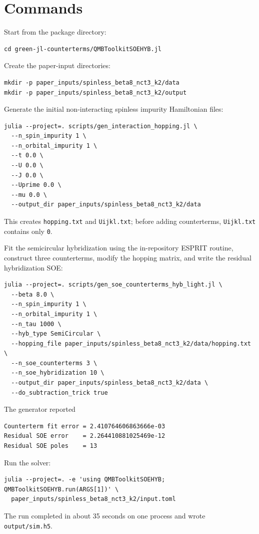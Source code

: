 \documentclass[11pt,a4paper]{article}
\theoremstyle{definition}
\theoremstyle{plain}
\begin{document}
\section{Commands}

Start from the package directory:
\begin{verbatim}
cd green-jl-counterterms/QMBToolkitSOEHYB.jl
\end{verbatim}

Create the paper-input directories:
\begin{verbatim}
mkdir -p paper_inputs/spinless_beta8_nct3_k2/data
mkdir -p paper_inputs/spinless_beta8_nct3_k2/output
\end{verbatim}

Generate the initial non-interacting spinless impurity Hamiltonian files:
\begin{verbatim}
julia --project=. scripts/gen_interaction_hopping.jl \
  --n_spin_impurity 1 \
  --n_orbital_impurity 1 \
  --t 0.0 \
  --U 0.0 \
  --J 0.0 \
  --Uprime 0.0 \
  --mu 0.0 \
  --output_dir paper_inputs/spinless_beta8_nct3_k2/data
\end{verbatim}
This creates \texttt{hopping.txt} and \texttt{Uijkl.txt}; before adding
counterterms, \texttt{Uijkl.txt} contains only \texttt{0}.

Fit the semicircular hybridization using the in-repository ESPRIT routine,
construct three counterterms, modify the hopping matrix, and write the residual
hybridization SOE:
\begin{verbatim}
julia --project=. scripts/gen_soe_counterterms_hyb_light.jl \
  --beta 8.0 \
  --n_spin_impurity 1 \
  --n_orbital_impurity 1 \
  --n_tau 1000 \
  --hyb_type SemiCircular \
  --hopping_file paper_inputs/spinless_beta8_nct3_k2/data/hopping.txt \
  --n_soe_counterterms 3 \
  --n_soe_hybridization 10 \
  --output_dir paper_inputs/spinless_beta8_nct3_k2/data \
  --do_subtraction_trick true
\end{verbatim}
The generator reported
\begin{verbatim}
Counterterm fit error = 2.410764606863666e-03
Residual SOE error    = 2.264410881025469e-12
Residual SOE poles    = 13
\end{verbatim}

Run the solver:
\begin{verbatim}
julia --project=. -e 'using QMBToolkitSOEHYB; QMBToolkitSOEHYB.run(ARGS[1])' \
  paper_inputs/spinless_beta8_nct3_k2/input.toml
\end{verbatim}
The run completed in about 35 seconds on one process and wrote
\texttt{output/sim.h5}.
\end{document}
